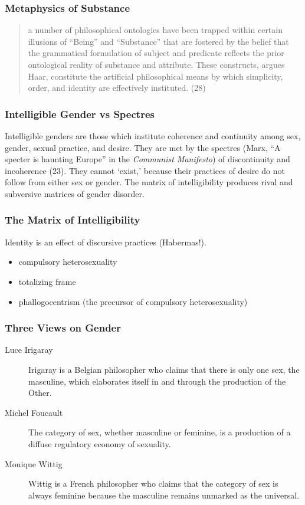 \documentclass[xcolor=dvipsnames]{beamer}
\begin{document}
\begin{frame}
  \frametitle{Metaphysics of Substance}
  \begin{quote}
    a number of philosophical ontologies have been trapped within
    certain illusions of ``Being'' and ``Substance'' that are fostered
    by the belief that the grammatical formulation of subject and
    predicate reflects the prior ontological reality of substance and
    attribute. These constructs, argues Haar, constitute the artificial
    philosophical means by which simplicity, order, and identity are
    effectively instituted. (28)
  \end{quote}
\end{frame}

\begin{frame}
  \frametitle{Intelligible Gender vs Spectres}
  Intelligible genders are those which institute coherence and
  continuity among sex, gender, sexual practice, and desire. They are
  met by the spectres (Marx, ``A specter is haunting Europe'' in the
  \emph{Communist Manifesto}) of discontinuity and incoherence (23).
  They cannot `exist,' because their practices of desire do not follow
  from either sex or gender. The matrix of intelligibility produces
  rival and subversive matrices of gender disorder.
\end{frame}

\begin{frame}
  \frametitle{The Matrix of Intelligibility}
  Identity is an effect of discursive practices (Habermas!). 
  \begin{itemize}
  \item compulsory heterosexuality
  \item totalizing frame
  \item phallogocentrism (the precursor of compulsory heterosexuality)
  \end{itemize}
\end{frame}

\begin{frame}
  \frametitle{Three Views on Gender}
  \begin{description}
  \item[Luce Irigaray] Irigaray is a Belgian philosopher who claims
    that there is only one sex, the masculine, which elaborates itself
    in and through the production of the Other.
  \item[Michel Foucault] The category of sex, whether masculine or
    feminine, is a production of a diffuse regulatory economy of
    sexuality.
  \item[Monique Wittig] Wittig is a French philosopher who claims
    that the category of sex is always feminine because the masculine
    remains unmarked as the universal.
  \end{description}
\end{frame}
\end{document}
